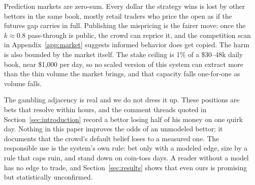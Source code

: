 Prediction markets are zero-sum. Every dollar the strategy wins is lost by
other bettors in the same book, mostly retail traders who price the open as
if the futures gap carries in full. Publishing the mispricing is the fairer
move: once the $k \approx 0.8$ pass-through is public, the crowd can
reprice it, and the competition scan in Appendix~\ref{app:market}
suggests informed behavior does get copied. The harm is also bounded by the
market itself. The stake ceiling is 1\% of a \$30--48k daily book, near
\$1{,}000 per day, so no scaled version of this system can extract more
than the thin volume the market brings, and that capacity falls one-for-one
as volume falls.

The gambling adjacency is real and we do not dress it up. These positions
are bets that resolve within hours, and the comment threads quoted in
Section~\ref{sec:introduction} record a bettor losing half of his money on
one quirk day. Nothing in this paper improves the odds of an unmodeled
bettor; it documents that the crowd's default belief loses to a measured
one. The responsible use is the system's own rule: bet only with a modeled
edge, size by a rule that caps ruin, and stand down on coin-toss days. A
reader without a model has no edge to trade, and Section~\ref{sec:results}
shows that even ours is promising but statistically unconfirmed.

